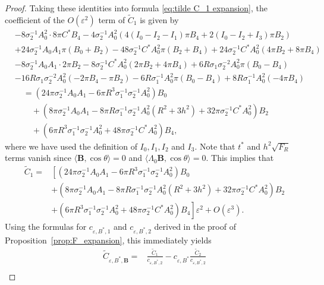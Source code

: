 \documentclass[12pt,reqno]{amsart}
\numberwithin{equation}{section}
\theoremstyle{definition}
\theoremstyle{remark}
\begin{document}
\begin{proof}
Taking these identities into formula \eqref{eq:tilde C_1 expansion},   the coefficient of the $O(\varepsilon^2)$ term of $\widetilde C_1$ is given by
\begin{align*}
	& -8 \sigma_2^{-1} A_0^2\cdot 8 \pi C^* B_4 -4 \sigma_2^{-1} A_0^2\left(4\left(I_0-I_2-I_1\right) \pi B_4+2\left(I_0-I_2+I_3\right) \pi B_2\right)  \\
	& +24\sigma_2^{-1} A_0 A_1 \pi\left(B_0+B_2\right) -48 \sigma_2^{-1} C^* A_0^2 \pi\left(B_2+B_4\right)+24 \sigma_2^{-1} C^* A_0^2\left(4 \pi B_2+8 \pi B_4\right)   \\
	& -8 \sigma_2^{-1} A_0 A_1 \cdot 2 \pi B_2-8 \sigma_2^{-1} C^* A_0^2\left(2 \pi B_2+4 \pi B_4\right)  +6R \sigma_1 \sigma_2^{-2} A_0^2 \pi\left(B_0-B_4\right) \\
	& -16 R \sigma_1 \sigma_2^{-2} A_0^2\left(-2 \pi B_4-\pi B_2\right)   -6 R \sigma_1^{-1} A_0^2 \pi\left(B_0-B_4\right) +8 R \sigma_1^{-1} A_0^2\left(-4 \pi B_4\right)  \\
	&\quad =\left(24 \pi \sigma_2^{-1} A_0 A_1  -6 \pi R^3 \sigma_1^{-1} \sigma_2^{-1} A_0^2\right)B_0\\
	&\qquad+\left(8 \pi \sigma_2^{-1} A_0 A_1-8 \pi R \sigma_1^{-1} \sigma_2^{-1} A_0^2\left(R^2+3 h^2\right)+32 \pi \sigma_2^{-1} C^* A_0^2\right)B_2   \\
	&\qquad +\left(6 \pi R^3 \sigma_1^{-1} \sigma_2^{-1} A_0^2+48\pi \sigma_2^{-1} C^* A_0^2\right) B_4, 
\end{align*}
where we have used the definition of $ I_0,I_1,I_2$  and  $ I_3 $. Note that  $ t^* $ and $ h^2\sqrt{F_R} $ terms vanish since $ \langle \textbf{B}, \cos\theta\rangle=0 $ and $ \langle\Lambda_0  \textbf{B}, \cos\theta\rangle=0 $. This implies that
\begin{align*} 
\widetilde C_1
=&\left[ \left(24 \pi \sigma_2^{-1} A_0 A_1  -6 \pi R^3 \sigma_1^{-1} \sigma_2^{-1} A_0^2\right)B_0\right .\\
& +\left(8 \pi \sigma_2^{-1} A_0 A_1-8 \pi R \sigma_1^{-1} \sigma_2^{-1} A_0^2\left(R^2+3 h^2\right)+32 \pi \sigma_2^{-1} C^* A_0^2\right)B_2   \\
& \left .+\left(6 \pi R^3 \sigma_1^{-1} \sigma_2^{-1} A_0^2+48\pi \sigma_2^{-1} C^* A_0^2\right) B_4\right] \varepsilon^2+O\left (\varepsilon^3\right ).
\end{align*} 
Using the formulas for $c_{\varepsilon,B^*,1}$ and $c_{\varepsilon,B^*,2}$ derived in the proof of Proposition~\ref{prop:F_expansion}, this immediately yields
\begin{align*}
\widetilde C_{\varepsilon,B^*,\textbf{B}}=&\frac{\widetilde C_1}{c_{\varepsilon,B^*,2}}-c_{\varepsilon,B^*}\frac{\widetilde C_2}{c_{\varepsilon,B^*,2}}  \\

\end{align*}
\end{proof}
\end{document}
